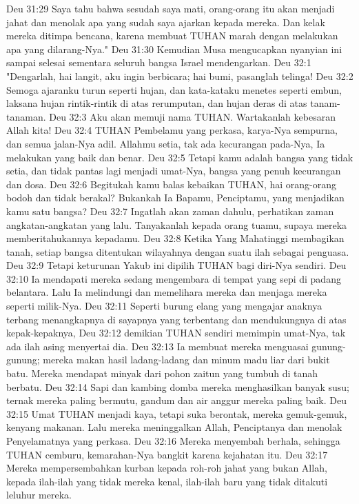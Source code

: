 Deu 31:29  Saya tahu bahwa sesudah saya mati, orang-orang itu akan menjadi jahat dan menolak apa yang sudah saya ajarkan kepada mereka. Dan kelak mereka ditimpa bencana, karena membuat TUHAN marah dengan melakukan apa yang dilarang-Nya."
Deu 31:30  Kemudian Musa mengucapkan nyanyian ini sampai selesai sementara seluruh bangsa Israel mendengarkan.
Deu 32:1  "Dengarlah, hai langit, aku ingin berbicara; hai bumi, pasanglah telinga!
Deu 32:2  Semoga ajaranku turun seperti hujan, dan kata-kataku menetes seperti embun, laksana hujan rintik-rintik di atas rerumputan, dan hujan deras di atas tanam-tanaman.
Deu 32:3  Aku akan memuji nama TUHAN. Wartakanlah kebesaran Allah kita!
Deu 32:4  TUHAN Pembelamu yang perkasa, karya-Nya sempurna, dan semua jalan-Nya adil. Allahmu setia, tak ada kecurangan pada-Nya, Ia melakukan yang baik dan benar.
Deu 32:5  Tetapi kamu adalah bangsa yang tidak setia, dan tidak pantas lagi menjadi umat-Nya, bangsa yang penuh kecurangan dan dosa.
Deu 32:6  Begitukah kamu balas kebaikan TUHAN, hai orang-orang bodoh dan tidak berakal? Bukankah Ia Bapamu, Penciptamu, yang menjadikan kamu satu bangsa?
Deu 32:7  Ingatlah akan zaman dahulu, perhatikan zaman angkatan-angkatan yang lalu. Tanyakanlah kepada orang tuamu, supaya mereka memberitahukannya kepadamu.
Deu 32:8  Ketika Yang Mahatinggi membagikan tanah, setiap bangsa ditentukan wilayahnya dengan suatu ilah sebagai penguasa.
Deu 32:9  Tetapi keturunan Yakub ini dipilih TUHAN bagi diri-Nya sendiri.
Deu 32:10  Ia mendapati mereka sedang mengembara di tempat yang sepi di padang belantara. Lalu Ia melindungi dan memelihara mereka dan menjaga mereka seperti milik-Nya.
Deu 32:11  Seperti burung elang yang mengajar anaknya terbang menangkapnya di sayapnya yang terbentang dan mendukungnya di atas kepak-kepaknya,
Deu 32:12  demikian TUHAN sendiri memimpin umat-Nya, tak ada ilah asing menyertai dia.
Deu 32:13  Ia membuat mereka menguasai gunung-gunung; mereka makan hasil ladang-ladang dan minum madu liar dari bukit batu. Mereka mendapat minyak dari pohon zaitun yang tumbuh di tanah berbatu.
Deu 32:14  Sapi dan kambing domba mereka menghasilkan banyak susu; ternak mereka paling bermutu, gandum dan air anggur mereka paling baik.
Deu 32:15  Umat TUHAN menjadi kaya, tetapi suka berontak, mereka gemuk-gemuk, kenyang makanan. Lalu mereka meninggalkan Allah, Penciptanya dan menolak Penyelamatnya yang perkasa.
Deu 32:16  Mereka menyembah berhala, sehingga TUHAN cemburu, kemarahan-Nya bangkit karena kejahatan itu.
Deu 32:17  Mereka mempersembahkan kurban kepada roh-roh jahat yang bukan Allah, kepada ilah-ilah yang tidak mereka kenal, ilah-ilah baru yang tidak ditakuti leluhur mereka.
